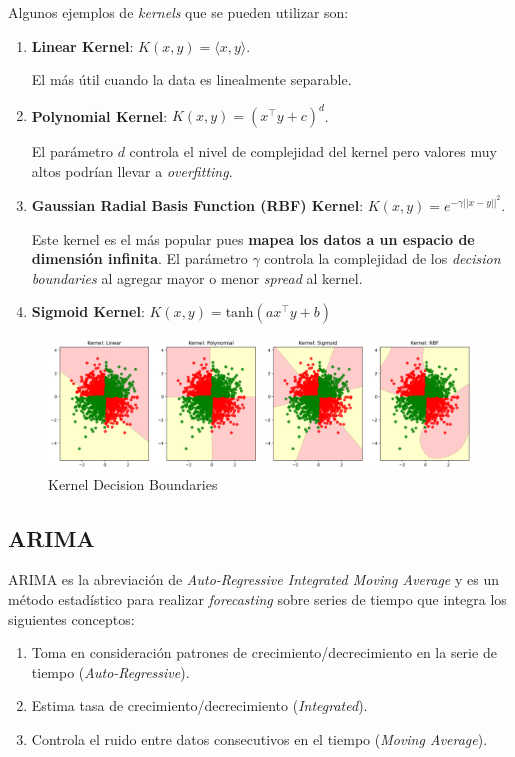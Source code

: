 Algunos ejemplos de \textit{kernels} que se pueden utilizar son: 

\begin{enumerate}
    \item \textbf{Linear Kernel}: $K(x,y) = \langle x , y \rangle$. 
    
    El más útil cuando la data es linealmente separable. 
    \item \textbf{Polynomial Kernel}: $K(x,y) = (x^{\top}y + c)^d$. 
    
    El parámetro $d$ controla el nivel de complejidad del kernel pero valores muy altos podrían llevar a \textit{overfitting}.
    \item \textbf{Gaussian Radial Basis Function (RBF) Kernel}: $K(x,y) = e^{-\gamma||x-y||^2}$. 
    
    Este kernel es el más popular pues \textbf{mapea los datos a un espacio de dimensión infinita}. El parámetro $\gamma$ controla la complejidad de los \textit{decision boundaries} al agregar mayor o menor \textit{spread} al kernel. 
    \item \textbf{Sigmoid Kernel}: $K(x,y) = \text{tanh}(ax^{\top}y + b)$
\end{enumerate}

\begin{figure}[H]
    \center
    \includegraphics[scale=0.35]{notebooks/ML/img/kernel_decision_boundaries.png}
    \caption{Kernel Decision Boundaries}
\end{figure}

\subsection{ARIMA}

ARIMA es la abreviación de \textit{Auto-Regressive Integrated Moving Average} y es un método estadístico para realizar \textit{forecasting} sobre series de tiempo que integra los siguientes conceptos:

\begin{enumerate}
    \item Toma en consideración patrones de crecimiento/decrecimiento en la serie de tiempo (\textit{Auto-Regressive}). 
    \item Estima tasa de crecimiento/decrecimiento (\textit{Integrated}).
    \item Controla el ruido entre datos consecutivos en el tiempo (\textit{Moving Average}).
\end{enumerate}

